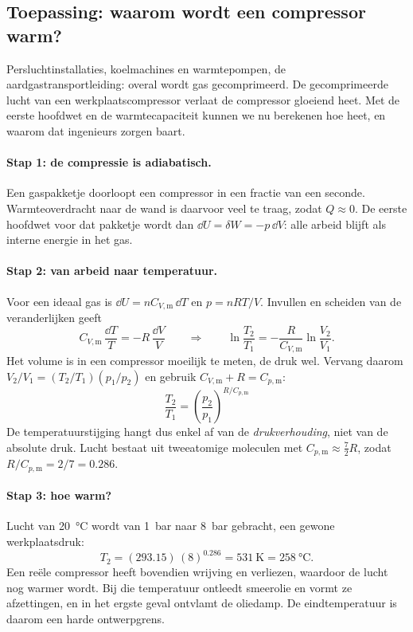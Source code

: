 \subsection{Toepassing: waarom wordt een compressor warm?}
\label{sec:compressor}

Persluchtinstallaties, koelmachines en warmtepompen, de aardgastransportleiding: overal wordt gas gecomprimeerd. De gecomprimeerde lucht van een werkplaatscompressor verlaat de compressor gloeiend heet. Met de eerste hoofdwet en de warmtecapaciteit kunnen we nu berekenen hoe heet, en waarom dat ingenieurs zorgen baart.

\paragraph{Stap 1: de compressie is adiabatisch.}
Een gaspakketje doorloopt een compressor in een fractie van een seconde. Warmteoverdracht naar de wand is daarvoor veel te traag, zodat $Q \approx 0$. De eerste hoofdwet voor dat pakketje wordt dan $\dd U = \delta W = -p\,\dd V$: alle arbeid blijft als interne energie in het gas.

\paragraph{Stap 2: van arbeid naar temperatuur.}
Voor een ideaal gas is $\dd U = nC_{V,\mathrm{m}}\,\dd T$ en $p = nRT/V$. Invullen en scheiden van de veranderlijken geeft
\[
C_{V,\mathrm{m}}\,\frac{\dd T}{T} = -R\,\frac{\dd V}{V}
\qquad\Longrightarrow\qquad
\ln\frac{T_2}{T_1} = -\frac{R}{C_{V,\mathrm{m}}}\ln\frac{V_2}{V_1}.
\]
Het volume is in een compressor moeilijk te meten, de druk wel. Vervang daarom $V_2/V_1 = (T_2/T_1)(p_1/p_2)$ en gebruik $C_{V,\mathrm{m}} + R = C_{p,\mathrm{m}}$:
\begin{equation}
\boxed{\;\frac{T_2}{T_1} = \left(\frac{p_2}{p_1}\right)^{R/C_{p,\mathrm{m}}}\;}
\label{eq:adiabatische-compressie}
\end{equation}
De temperatuurstijging hangt dus enkel af van de \emph{drukverhouding}, niet van de absolute druk. Lucht bestaat uit tweeatomige moleculen met $C_{p,\mathrm{m}} \approx \tfrac{7}{2}R$, zodat $R/C_{p,\mathrm{m}} = 2/7 = 0.286$.

\paragraph{Stap 3: hoe warm?}
Lucht van \SI{20}{\celsius} wordt van \SI{1}{\bar} naar \SI{8}{\bar} gebracht, een gewone werkplaatsdruk:
\[
T_2 = (293.15)\,(8)^{0.286} = \SI{531}{\kelvin} = \SI{258}{\celsius}.
\]
Een re\"ele compressor heeft bovendien wrijving en verliezen, waardoor de lucht nog warmer wordt. Bij die temperatuur ontleedt smeerolie en vormt ze afzettingen, en in het ergste geval ontvlamt de oliedamp. De eindtemperatuur is daarom een harde ontwerpgrens.


